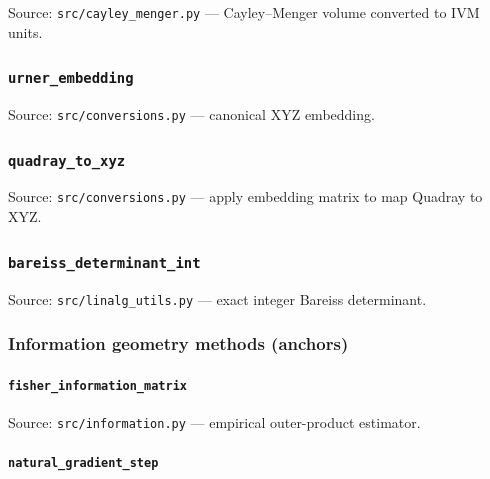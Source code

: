 \documentclass[
  10pt,
]{article}
\begin{document}
Source: \texttt{src/cayley\_menger.py} --- Cayley--Menger volume
converted to IVM units.

\hypertarget{code:urner_embedding}{%
\subsubsection{\texorpdfstring{\texttt{urner\_embedding}}{urner\_embedding}}\label{code:urner_embedding}}

Source: \texttt{src/conversions.py} --- canonical XYZ embedding.

\hypertarget{code:quadray_to_xyz}{%
\subsubsection{\texorpdfstring{\texttt{quadray\_to\_xyz}}{quadray\_to\_xyz}}\label{code:quadray_to_xyz}}

Source: \texttt{src/conversions.py} --- apply embedding matrix to map
Quadray to XYZ.

\hypertarget{code:bareiss_determinant_int}{%
\subsubsection{\texorpdfstring{\texttt{bareiss\_determinant\_int}}{bareiss\_determinant\_int}}\label{code:bareiss_determinant_int}}

Source: \texttt{src/linalg\_utils.py} --- exact integer Bareiss
determinant.

\hypertarget{information-geometry-methods-anchors}{%
\subsubsection{Information geometry methods
(anchors)}\label{information-geometry-methods-anchors}}

\hypertarget{code:fisher_information_matrix}{%
\paragraph{\texorpdfstring{\texttt{fisher\_information\_matrix}}{fisher\_information\_matrix}}\label{code:fisher_information_matrix}}

Source: \texttt{src/information.py} --- empirical outer-product
estimator.

\hypertarget{code:natural_gradient_step}{%
\paragraph{\texorpdfstring{\texttt{natural\_gradient\_step}}{natural\_gradient\_step}}\label{code:natural_gradient_step}}
\end{document}
